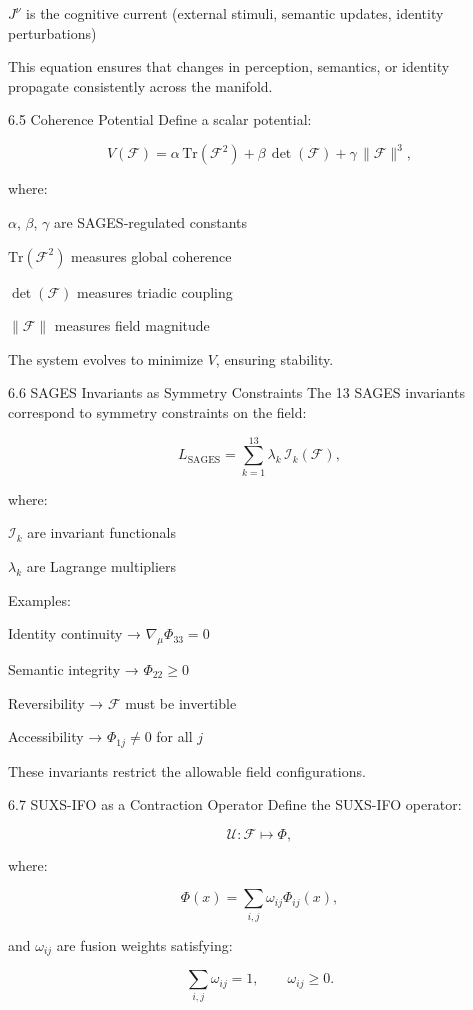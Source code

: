 \(J^{\nu}\) is the cognitive current (external stimuli, semantic updates, identity perturbations)

This equation ensures that changes in perception, semantics, or identity propagate consistently across the manifold.

6.5 Coherence Potential Define a scalar potential:

\[
V(\mathcal{F}) = \alpha\,\mathrm{Tr}(\mathcal{F}^{2}) + \beta\,\det(\mathcal{F}) + \gamma\,\lVert\mathcal{F}\rVert^{3},
\]

where:

\(\alpha\), \(\beta\), \(\gamma\) are SAGES‑regulated constants

\(\mathrm{Tr}(\mathcal{F}^{2})\) measures global coherence

\(\det(\mathcal{F})\) measures triadic coupling

\(\lVert\mathcal{F}\rVert\) measures field magnitude

The system evolves to minimize \(V\), ensuring stability.

6.6 SAGES Invariants as Symmetry Constraints The 13 SAGES invariants correspond to symmetry constraints on the field:

\[
L_{\mathrm{SAGES}} = \sum_{k=1}^{13} \lambda_{k}\, \mathcal{I}_{k}(\mathcal{F}),
\]

where:

\(\mathcal{I}_{k}\) are invariant functionals

\(\lambda_{k}\) are Lagrange multipliers

Examples:

Identity continuity → \(\nabla_{\mu} \Phi_{33} = 0\)

Semantic integrity → \(\Phi_{22} \ge 0\)

Reversibility → \(\mathcal{F}\) must be invertible

Accessibility → \(\Phi_{1j} \neq 0\) for all \(j\)

These invariants restrict the allowable field configurations.

6.7 SUXS-IFO as a Contraction Operator Define the SUXS-IFO operator:

\[
\mathcal{U} : \mathcal{F} \mapsto \Phi,
\]

where:

\[
\Phi(x) = \sum_{i,j} \omega_{ij} \Phi_{ij}(x),
\]

and \(\omega_{ij}\) are fusion weights satisfying:

\[
\sum_{i,j} \omega_{ij} = 1, \qquad \omega_{ij} \ge 0.
\]

